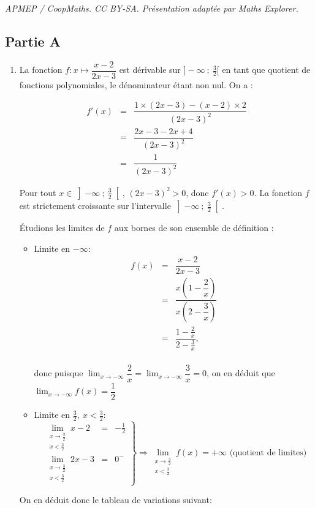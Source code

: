\documentclass[10pt]{article}
\begin{document}
\noindent\textit{APMEP / CoopMaths. CC BY-SA. Présentation adaptée par Maths Explorer.}\par\medskip
\subsection*{Partie A}
\begin{enumerate}
\item La fonction $f:x \mapsto \dfrac{x-2}{2x-3}$ est dérivable sur $]-\infty~;~\frac32[$ en tant que quotient de fonctions polynomiales, le dénominateur étant non nul. On a :

\[\begin{array}{rcl}
f'(x) &=& \dfrac{1 \times (2x - 3) - (x - 2) \times 2}{(2x - 3)^2} \\
&=& \dfrac{2x - 3 - 2x + 4}{(2x - 3)^2}\\
&=& \dfrac{1}{(2x - 3)^2}
\end{array}\]

Pour tout $x \in \left]-\infty~;~\frac32\right[$,\: $(2x - 3)^2 > 0$, donc $f'(x) > 0$. La fonction $f$ est strictement croissante sur l'intervalle $\left]-\infty~;~\frac32\right[$.

Étudions les limites de $f$ aux bornes de son ensemble de définition :
\begin{itemize}
	\item Limite en $-\infty$: 
	\[\begin{matrix}
	f(x) &=&\dfrac{x-2}{2x-3} \\
	&=&\dfrac{x\left(1-\dfrac2{x}\right)}{x\left(2-\dfrac3{x}\right)}\\
	& =&\dfrac{1-\frac2{x}}{2-\frac3{x}}, \\
\end{matrix}\]

donc puisque $\displaystyle \lim_{x \to - \infty}\dfrac2{x} = \displaystyle \lim_{x \to - \infty}\dfrac3{x} = 0$, on en déduit que $\displaystyle \lim_{x \to - \infty} f(x)  = \dfrac12$ 

\item Limite en $\frac{3}{2}, \: x < \frac{3}{2}$: 
\[ 
\left.
\begin{matrix}
\displaystyle \lim_{\substack{x \to \frac32\\ x < \frac32}}x - 2 &=& -\frac12 \\
\displaystyle \lim_{\substack{x \to \frac32\\ x < \frac32}} 2x-3 &=& 0^-
\end{matrix}
\right\}
\Rightarrow \lim_{\substack{x \to \frac32\\ x < \frac32}} f(x)= +\infty \text{ (quotient de limites)} 
\]
\end{itemize}
On en déduit donc le tableau de variations suivant:


\end{enumerate}
\end{document}
